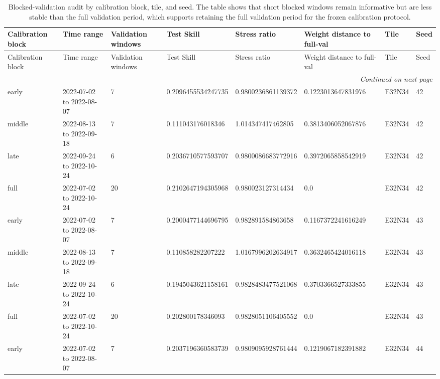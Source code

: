 \scriptsize
\setlength{\LTleft}{0pt}
\setlength{\LTright}{0pt}
\begin{longtable}{llllllll}
\caption{Blocked-validation audit by calibration block, tile, and seed. The table shows that short blocked windows remain informative but are less stable than the full validation period, which supports retaining the full validation period for the frozen calibration protocol.}\label{tab:e4_blocked_validation_full}\\
\toprule
Calibration block & Time range & Validation windows & Test Skill & Stress ratio & Weight distance to full-val & Tile & Seed \\
\midrule
\endfirsthead
\toprule
Calibration block & Time range & Validation windows & Test Skill & Stress ratio & Weight distance to full-val & Tile & Seed \\
\midrule
\endhead
\midrule
\multicolumn{8}{r}{\textit{Continued on next page}} \\
\endfoot
\bottomrule
\endlastfoot
early & 2022-07-02 to 2022-08-07 & 7 & 0.2096455534247735 & 0.9800236861139372 & 0.1223013647831976 & E32N34 & 42 \\
middle & 2022-08-13 to 2022-09-18 & 7 & 0.111043176018346 & 1.014347417462805 & 0.3813406052067876 & E32N34 & 42 \\
late & 2022-09-24 to 2022-10-24 & 6 & 0.2036710577593707 & 0.9800086683772916 & 0.3972065858542919 & E32N34 & 42 \\
full & 2022-07-02 to 2022-10-24 & 20 & 0.2102647194305968 & 0.980023127314434 & 0.0 & E32N34 & 42 \\
early & 2022-07-02 to 2022-08-07 & 7 & 0.2000477144696795 & 0.982891584863658 & 0.1167372241616249 & E32N34 & 43 \\
middle & 2022-08-13 to 2022-09-18 & 7 & 0.110858282207222 & 1.0167996202634917 & 0.3632465424016118 & E32N34 & 43 \\
late & 2022-09-24 to 2022-10-24 & 6 & 0.1945043621158161 & 0.9828483477521068 & 0.3703366527333855 & E32N34 & 43 \\
full & 2022-07-02 to 2022-10-24 & 20 & 0.202800178346093 & 0.9828051106405552 & 0.0 & E32N34 & 43 \\
early & 2022-07-02 to 2022-08-07 & 7 & 0.2037196360583739 & 0.9809095928761444 & 0.1219067182391882 & E32N34 & 44 \\

\end{longtable}
